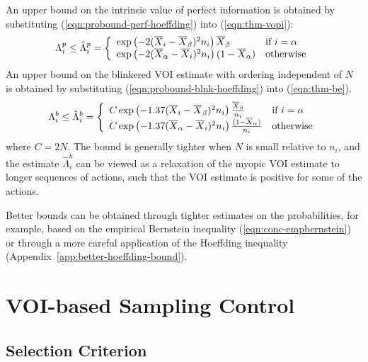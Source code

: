 \documentclass{article}
\begin{document}
An upper bound on the intrinsic value of perfect information is obtained by substituting
(\ref{eqn:probound-perf-hoeffding}) into (\ref{eqn:thm-vopi}):
\begin{equation}
  \Lambda_i^p \le \hat\Lambda_i^p=\left\{
  \begin{array}{l l}
    \exp\left(- 2(\overline X_i - \overline X_\beta)^2 n_i \right)\overline X_\beta & \mbox{if $i=\alpha$} \\
    \exp\left(- 2(\overline X_\alpha - \overline X_i)^2 n_i \right)(1-\overline  X_\alpha)  &  \mbox{otherwise}
  \end{array} \right.
\label{eqn:bound-perf-hoeffding}
\end{equation}
An upper bound on the blinkered VOI estimate with ordering independent of $N$ is obtained
by substituting (\ref{eqn:probound-blnk-hoeffding}) into (\ref{eqn:thm-be}).
\begin{equation}
  \Lambda_i^b \le \hat\Lambda_i^b=\left\{
  \begin{array}{l l}
    C \exp\left(- 1.37(\overline X_i - \overline X_\beta)^2 n_i\right)\frac {\overline X_\beta} {n_i}
      & \mbox{if $i=\alpha$} \\
    C \exp\left(- 1.37(\overline X_\alpha - \overline X_i)^2 n_i\right)\frac {(1-\overline  X_\alpha)} {n_i}
      &  \mbox{otherwise}
  \end{array} \right.
\label{eqn:bound-blnk-hoeffding}
\end{equation}
where $C=2N$. The bound is generally tighter when $N$ is small relative to $n_i$,
and the estimate $\hat\Lambda_i^b$ can be viewed as a relaxation of the myopic VOI
estimate to longer sequences of actions, such
that the VOI estimate is positive for some of the actions.

Better bounds can be obtained through tighter estimates on the
probabilities, for example, based on the empirical Bernstein inequality
(\ref{eqn:conc-empbernstein}) or through a more careful application of
the Hoeffding inequality (Appendix~\ref{app:better-hoeffding-bound}).

\section{VOI-based Sampling Control}

\subsection{Selection Criterion}
\end{document}
